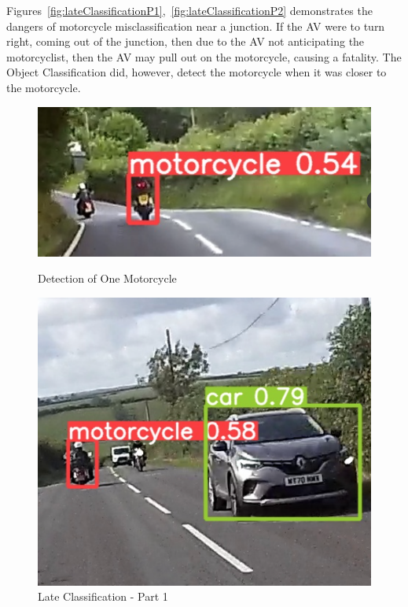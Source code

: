 \documentclass[conference]{IEEEtran}
\begin{document}
    Figures~\ref{fig:lateClassificationP1},~\ref{fig:lateClassificationP2} demonstrates the dangers of motorcycle misclassification near a junction. If the AV were to turn right, coming out of the junction, then due to the AV not anticipating the motorcyclist, then the AV may pull out on the motorcycle, causing a fatality. The Object Classification did, however, detect the motorcycle when it was closer to the motorcycle.
	\begin{figure}[h]
		\centering
		\begin{minipage}{0.15\textwidth}
			\centering
			\includegraphics[width=\linewidth]{Figures/fail.png}
			\caption{Detection of One Motorcycle}
			\label{fig:detectionOfOneMotorcycle}
		\end{minipage}\hfill
		\begin{minipage}{0.15\textwidth}
			\centering
			\includegraphics[width=\linewidth]{Figures/left_turn.png}
			\caption{Late Classification - Part 1}

\end{minipage}
\end{figure}
\end{document}
